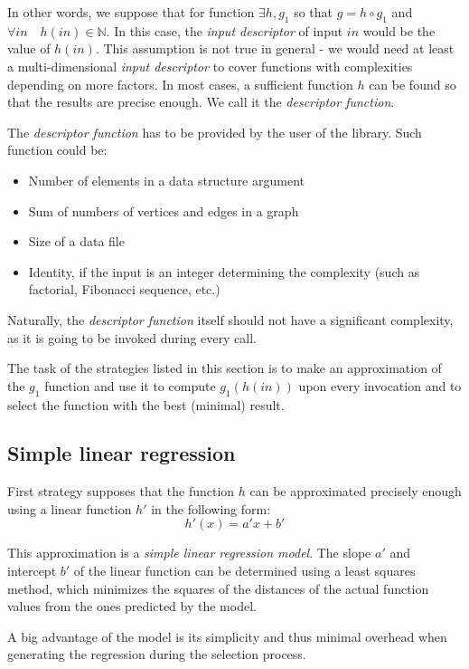 In other words, we suppose that for function  \(\exists h, g_1\) so that
\(g = h \circ g_1\) 
and 
\(\forall in \quad h(in) \in \mathbb{N}\). In this case, the \textit{input descriptor} of input \(in\) would be the value of \(h(in)\).
This assumption is not true in general - we would need at least a multi-dimensional \textit{input descriptor} to cover functions with complexities depending on more factors. In most cases, a sufficient function \(h\) can be found so that the results are precise enough. We call it the \textit{descriptor function}.

The \textit{descriptor function} has to be provided by the user of the library. %
Such function could be:
\begin{itemize}
	\item Number of elements in a data structure argument
	\item Sum of numbers of vertices and edges in a graph
	\item Size of a data file
	\item Identity, if the input is an integer determining the complexity (such as factorial, Fibonacci sequence, etc.)
\end{itemize}
Naturally, the \textit{descriptor function} itself should not have a significant complexity, as it is going to be invoked during every call.

The task of the strategies listed in this section is to make an approximation of the \(g_1\) function and use it to compute \(g_1(h(in))\) upon every invocation and to select the function with the best (minimal) result.

\subsection{Simple linear regression}
\label{subsec:simple_linear_regression}

First strategy supposes that the function \(h\) can be approximated precisely enough using a linear function \(h'\) in the following form:
\[h'(x) = a' x + b'\]

This approximation is a \textit{simple linear regression model}. The slope \(a'\) and intercept \(b'\) of the linear function can be determined using a least squares method, which minimizes the squares of the distances of the actual function values from the ones predicted by the model.

A big advantage of the model is its simplicity and thus minimal overhead when generating the regression during the selection process. 

